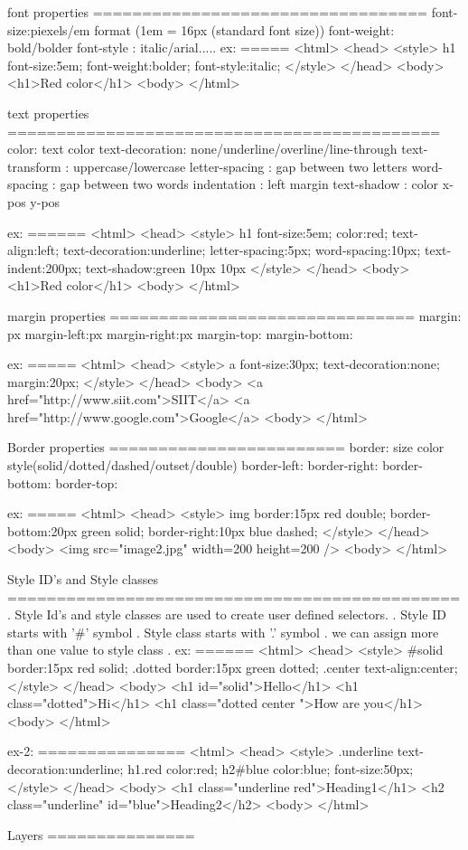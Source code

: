 font properties
==================================
font-size:piexels/em format (1em = 16px (standard font size))
font-weight: bold/bolder
font-style : italic/arial.....
ex:
=====
<html>
  <head>
    <style>
	  h1
	  {
	    font-size:5em;
		font-weight:bolder;
		font-style:italic;
	  }
	</style>
  </head>
  <body>
    <h1>Red color</h1>
  <body>
</html>

text properties
============================================
color: text color
text-decoration: none/underline/overline/line-through
text-transform : uppercase/lowercase
letter-spacing : gap between two letters
word-spacing   : gap between two words
indentation    : left margin
text-shadow    : color x-pos y-pos

ex:
======
<html>
  <head>
    <style>
	  h1
	  {
	    font-size:5em;
		color:red;
		text-align:left;
		text-decoration:underline;
		letter-spacing:5px;
		word-spacing:10px;
		text-indent:200px;
		text-shadow:green 10px 10px
	  }
	</style>
  </head>
  <body>
    <h1>Red color</h1>
  <body>
</html>

margin properties
===============================
margin: px
margin-left:px
margin-right:px
margin-top:
margin-bottom:

ex:
=====
<html>
  <head>
    <style>
	  a 
	  {
		font-size:30px;
		text-decoration:none;	
		margin:20px;
	  }
	</style>
  </head>
  <body>
	<a href="http://www.siit.com">SIIT</a>
	<a href="http://www.google.com">Google</a>
  <body>
</html>


Border properties
========================
border: size color style(solid/dotted/dashed/outset/double)
border-left:
border-right:
border-bottom:
border-top:

ex:
=====
<html>
  <head>
    <style>
	  img 
	  {
		border:15px red double;
		border-bottom:20px green solid;
		border-right:10px blue dashed;
	  }
	</style>
  </head>
  <body>
    <img src="image2.jpg" width=200 height=200 />
  <body>
</html>


Style ID's and Style classes
==============================================
. Style Id's and style classes are used to create user defined selectors.
. Style ID starts with '#' symbol
. Style class starts with '.' symbol
. we can assign more than one value to style class
. ex:
======
<html>
  <head>
    <style>
	  #solid 
	  {
	    border:15px red solid;
	  }
	  .dotted
	  {
	   border:15px green dotted;
	  }
	  .center
	  {
	    text-align:center;
	  }
	</style>
  </head>
  <body>
	<h1 id="solid">Hello</h1>
	<h1 class="dotted">Hi</h1>
	<h1 class="dotted center ">How are you</h1>
  <body>
</html>


ex-2:
===============
<html>
  <head>
    <style>
	  .underline
	  {
	    text-decoration:underline;
	  }
	  h1.red
	  {
	    color:red;
	  }
	  h2#blue
	  {
	   color:blue;
	   font-size:50px;
	  }
	</style>
  </head>
  <body>
	<h1 class="underline red">Heading1</h1>
	<h2 class="underline" id="blue">Heading2</h2>
  <body>
</html>

Layers
===============